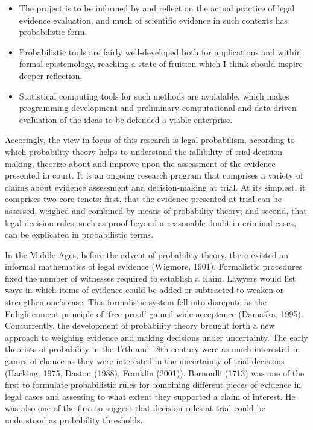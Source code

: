 \documentclass[11pt,dvipsnames,enabledeprecatedfontcommands]{scrartcl}
\begin{document}
\begin{itemize}
\item
  The project is to be informed by and reflect on the actual practice of
  legal evidence evaluation, and much of scientific evidence in such
  contexts has probabilistic form.
\item
  Probabilistic tools are fairly well-developed both for applications
  and within formal epistemology, reaching a state of fruition which I
  think should inspire deeper reflection.
\item
  Statistical computing tools for such methods are avaialable, which
  makes programming development and preliminary computational and
  data-driven evaluation of the ideas to be defended a viable
  enterprise.
\end{itemize}

Accoringly, the view in focus of this research is legal probabilism,
according to which probability theory helps to understand the
fallibility of trial decision-making, theorize about and improve upon
the assessment of the evidence presented in court. It is an ongoing
research program that comprises a variety of claims about evidence
assessment and decision-making at trial. At its simplest, it comprises
two core tenets: first, that the evidence presented at trial can be
assessed, weighed and combined by means of probability theory; and
second, that legal decision rules, such as proof beyond a reasonable
doubt in criminal cases, can be explicated in probabilistic terms.

In the Middle Ages, before the advent of probability theory, there
existed an informal mathematics of legal evidence (Wigmore, 1901).
Formalistic procedures fixed the number of witnesses required to
establish a claim. Lawyers would list ways in which items of evidence
could be added or subtracted to weaken or strengthen one's case. This
formalistic system fell into disrepute as the Enlightenment principle of
`free proof' gained wide acceptance (Damaška, 1995). Concurrently, the
development of probability theory brought forth a new approach to
weighing evidence and making decisions under uncertainty. The early
theorists of probability in the 17th and 18th century were as much
interested in games of chance as they were interested in the uncertainty
of trial decisions (Hacking, 1975, Daston (1988), Franklin (2001)).
Bernoulli (1713) was one of the first to formulate probabilistic rules
for combining different pieces of evidence in legal cases and assessing
to what extent they supported a claim of interest. He was also one of
the first to suggest that decision rules at trial could be understood as
probability thresholds.
\end{document}
